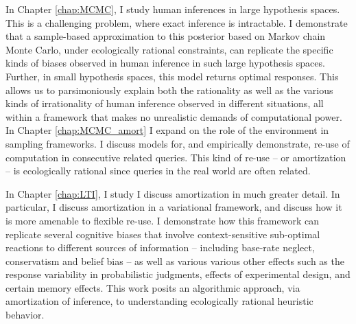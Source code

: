 In Chapter \ref{chap:MCMC}, I study human inferences in large hypothesis spaces. This is a challenging problem, where exact inference is intractable. I demonstrate that a sample-based approximation to this posterior based on Markov chain Monte Carlo, under ecologically rational constraints, can replicate the specific kinds of biases observed in human inference in such large hypothesis spaces. 
Further, in small hypothesis spaces, this model returns optimal responses. This allows us to parsimoniously explain both the rationality as well as the various kinds of irrationality of human inference observed in different situations, all within a framework that makes no unrealistic demands of computational power. In Chapter \ref{chap:MCMC_amort} I expand on the role of the environment in sampling frameworks. I discuss models for, and empirically demonstrate, re-use of computation in consecutive related queries. This kind of re-use -- or amortization -- is ecologically rational since queries in the real world are often related.

In Chapter \ref{chap:LTI}, I study I discuss amortization in much greater detail. In particular, I discuss amortization in a variational framework, and discuss how it is more amenable to flexible re-use. I demonstrate how this framework can replicate several cognitive biases that involve context-sensitive sub-optimal reactions to different sources of information -- including base-rate neglect, conservatism and belief bias -- as well as various various other effects such as the response variability in probabilistic judgments, effects of experimental design, and certain memory effects. This work posits an algorithmic approach, via amortization of inference, to understanding ecologically rational heuristic behavior. 

